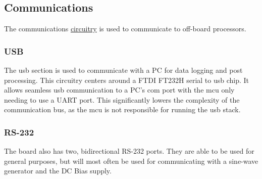 \subsection{Communications}

The communications \hyperlink{sch:com}{circuitry} is used to communicate to off-board processors.

\subsubsection{USB}
The \gls{usb} section is used to communicate with a PC for data logging and post processing. This circuitry centers around a FTDI FT232H serial to \gls{usb} chip. It allows seamless \gls{usb} communication to a PC's com port with the \gls{mcu} only needing to use a UART port. This significantly lowers the complexity of the communication bus, as the \gls{mcu} is not responsible for running the \gls{usb} stack.

\subsubsection{RS-232}
The board also has two, bidirectional RS-232 ports. They are able to be used for general purposes, but will most often be used for communicating with a sine-wave generator and the DC Bias supply.

